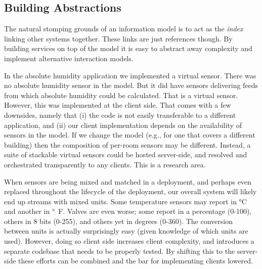 \subsection{Building Abstractions}

The natural stomping grounds of an information model is to act as the \textsl{index} linking other systems together. These links are just references though. By building services on top of the model it is easy to abstract away complexity and implement alternative interaction models.

In the absolute humidity application we implemented a virtual sensor. There was no absolute humidity sensor in the model. But it did have sensors delivering feeds from which absolute humidity could be calculated. That is a virtual sensor. However, this was implemented at the client side. That comes with a few downsides, namely that (i) the code is not easily transferable to a different application, and (ii) our client implementation depends on the availability of sensors in the model. If we change the model (e.g., for one that covers a different building) then the composition of per-room sensors may be different. Instead, a suite of stackable virtual sensors could be hosted server-side, and resolved and orchestrated transparently to any clients. This is a research area.

When sensors are being mixed and matched in a deployment, and perhaps even replaced throughout the lifecycle of the deployment, our overall system will likely end up streams with mixed units. Some temperature sensors may report in \si{\degreeCelsius} and another in \si{\degree F}. Valves are even worse; some report in a percentage (0-100), others in 8 bits (0-255), and others yet in degrees (0-360). The conversion between units is actually surprisingly easy (given knowledge of which units are used). However, doing so client side increases client complexity, and introduces a separate codebase that needs to be properly tested. By shifting this to the server-side these efforts can be combined and the bar for implementing clients lowered.


